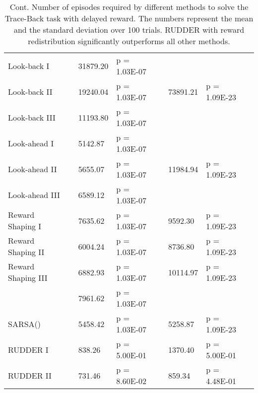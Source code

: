 \documentclass{article}
\begin{document}
\begin{appendices}
\begin{landscape}
\begin{table}[htp]
\begin{center}
\caption{Cont. Number of episodes required by different 
 methods to solve the Trace-Back task with delayed reward. The numbers represent the  
 mean and the standard deviation over 100 trials.
 RUDDER with reward redistribution significantly outperforms all other methods.
}
\label{tab:Ares2}\begin{tabular}{*{1}{>{\raggedright}p{14em}}*{1}{>{\columncolor{mColor1}\raggedleft}p{4em}}*{1}{>{\columncolor{mColor1}\raggedleft}p{5em}}*{1}{>{\columncolor{mColor1}\raggedright}p{5em}}*{1}{>{\raggedleft}p{4em}}*{1}{>{\raggedleft}p{5em}}*{1}{>{\raggedright}p{5em}}*{1}{>{\raggedright}p{0.01em}}}
\toprule[1pt]
\addlinespace[2pt]
{\bf Method} &\multicolumn{3}{c}{\bf Delay 20} &\multicolumn{3}{c}{\bf Delay 25} &\\
\toprule[1pt]
Look-back I & 113873.30 & {\small  31879.20} & {\small p = 1.03E-07} &  &  &  &  \\
Look-back II & 56830.30 & {\small  19240.04} & {\small p = 1.03E-07} & 111693.34 & {\small  73891.21} & {\small p = 1.09E-23} &  \\
Look-back III & 35852.10 & {\small  11193.80} & {\small p = 1.03E-07} &  &  &  &  \\
Look-ahead I & 187486.50 & {\small  5142.87} & {\small p = 1.03E-07} &  &  &  &  \\
Look-ahead II & 181974.30 & {\small  5655.07} & {\small p = 1.03E-07} & 289782.08 & {\small  11984.94} & {\small p = 1.09E-23} &  \\
Look-ahead III & 210029.90 & {\small  6589.12} & {\small p = 1.03E-07} &  &  &  &  \\
Reward Shaping I & 189870.30 & {\small  7635.62} & {\small p = 1.03E-07} & 297993.28 & {\small  9592.30} & {\small p = 1.09E-23} &  \\
Reward Shaping II & 170455.30 & {\small  6004.24} & {\small p = 1.03E-07} & 274312.10 & {\small  8736.80} & {\small p = 1.09E-23} &  \\
Reward Shaping III & 183592.60 & {\small  6882.93} & {\small p = 1.03E-07} & 291810.28 & {\small  10114.97} & {\small p = 1.09E-23} &  \\
 & 186874.40 & {\small  7961.62} & {\small p = 1.03E-07} &  &  &  &  \\
SARSA() & 273060.70 & {\small  5458.42} & {\small p = 1.03E-07} & 454031.36 & {\small  5258.87} & {\small p = 1.09E-23} &  \\
RUDDER I & 1048.97 & {\small  838.26} & {\small p = 5.00E-01} & 1236.57 & {\small  1370.40} & {\small p = 5.00E-01} &  \\
RUDDER II & 1159.30 & {\small  731.46} & {\small p = 8.60E-02} & 1195.75 & {\small  859.34} & {\small p = 4.48E-01} &  \\
\end{tabular}



\end{center}
\end{table}
\end{landscape}
\end{appendices}
\end{document}
